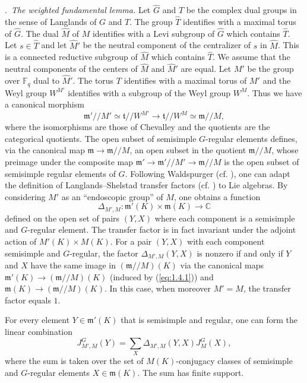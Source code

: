 \documentclass[12pt,a4paper,oneside,english,leqno]{smfart}
\makeatletter
\numberwithin{equation}{subsection}
\numberwithin{theo}{subsection}
\newenvironment{paragr}[1][]{\medskip\refstepcounter{subsection}%
  \par\noindent\hspace*{\parindent}\thesubsection.\ \emph{#1}%
  \@ifundefined{@empty}{}{}\ignorespaces}{\medskip}
\theoremstyle{plain}
\theoremstyle{definition}
\theoremstyle{remark}
\newcommand{\CC}{\mathbb{C}}
\newcommand{\Fq}{\mathbb{F}_q}
\newcommand{\Gc}{\widehat{G}}
\newcommand{\Tc}{\widehat{T}}
\newcommand{\Mc}{\widehat{M}}
\newcommand{\mgo}{\mathfrak{m}}
\newcommand{\tgo}{\mathfrak{t}}
\makeatother
\begin{document}
\begin{paragr}[The weighted fundamental lemma.]
Let $\Gc$ and $\Tc$ be the complex dual groups in the sense of Langlands of $G$ and $T$. The group $\Tc$ identifies with a maximal torus of $\Gc$. The dual $\Mc$ of $M$ identifies with a Levi subgroup of $\Gc$ which contains $\Tc$. Let $s\in \Tc$ and let $\Mc'$ be the neutral component of the centralizer of $s$ in $\Mc$. This is a connected reductive subgroup of $\Mc$ which contains $\Tc$. We assume that the neutral components of the centers of $\Mc$ and $\Mc'$ are equal. Let $M'$ be the group over $\Fq$ dual to $\Mc'$. The torus $T$ identifies with a maximal torus of $M'$ and the Weyl group $W^{M'}$ identifies with a subgroup of the Weyl group $W^M$. Thus we have a canonical morphism
\begin{equation}\label{eq:1.4.1}
  \mgo'//M' \simeq \tgo //W^{M'} \to \tgo //W^M \simeq \mgo//M,
\end{equation}
where the isomorphisms are those of Chevalley and the quotients are the categorical quotients. The open subset of semisimple $G$-regular elements defines, via the canonical map $\mgo\to \mgo//M$, an open subset in the quotient $\mgo//M$, whose preimage under the composite map $\mgo'\to \mgo'//M'\to\mgo//M$ is the open subset of semisimple regular elements of $G$. Following Waldspurger (cf. \cite{Waldspurger-transfert}), one can adapt the definition of Langlands–Shelstad transfer factors (cf. \cite{Langlands-Shelstad}) to Lie algebras. By considering $M'$ as an “endoscopic group” of $M$, one obtains a function
$$\Delta_{M',M} : \mgo'(K) \times \mgo(K) \to \CC$$
defined on the open set of pairs $(Y,X)$ where each component is a semisimple and $G$-regular element. The transfer factor is in fact invariant under the adjoint action of $M'(K)\times M(K)$. For a pair $(Y,X)$ with each component semisimple and $G$-regular, the factor $\Delta_{M',M}(Y,X)$ is nonzero if and only if $Y$ and $X$ have the same image in $(\mgo//M)(K)$ via the canonical maps $\mgo'(K)\to (\mgo//M)(K)$ (induced by (\ref{eq:1.4.1})) and $\mgo(K)\to (\mgo//M)(K)$. In this case, when moreover $M'=M$, the transfer factor equals $1$.

For every element $Y\in \mgo'(K)$ that is semisimple and regular, one can form the linear combination
$$J^G_{M',M}(Y)=\sum_{X} \Delta_{M',M}(Y,X)J_M^G(X),$$
where the sum is taken over the set of $M(K)$-conjugacy classes of semisimple and $G$-regular elements $X \in \mgo(K)$. The sum has finite support.


\end{paragr}
\end{document}
